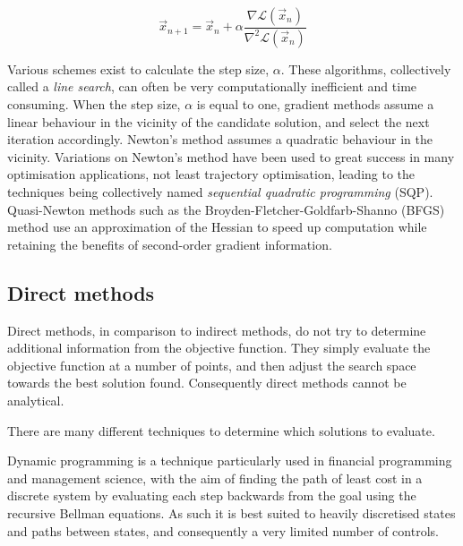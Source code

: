 \begin{equation} \label{eq:newtons-method}
\vec{x}_{n+1}=\vec{x}_n + \alpha\frac{\nabla\mathcal{L}(\vec{x}_n)}{\nabla^2\mathcal{L}(\vec{x}_n)}
\end{equation}

Various schemes exist to calculate the step size, $\alpha$. These algorithms, collectively called a \emph{line search}, can often be very computationally inefficient and time consuming. When the step size, $\alpha$ is equal to one, gradient methods assume a linear behaviour in the vicinity of the candidate solution, and select the next iteration accordingly. Newton's method assumes a quadratic behaviour in the vicinity. Variations on Newton's method have been used to great success in many optimisation applications, not least trajectory optimisation, leading to the techniques being collectively named \emph{sequential quadratic programming} (SQP). Quasi-Newton methods such as the Broyden-Fletcher-Goldfarb-Shanno (BFGS) method use an approximation of the Hessian to speed up computation while retaining the benefits of second-order gradient information. 



\subsection{Direct methods}

Direct methods, in comparison to indirect methods, do not try to determine additional information from the objective function. They simply evaluate the objective function at a number of points, and then adjust the search space towards the best solution found. Consequently direct methods cannot be analytical. %

There are many different techniques to determine which solutions to evaluate.

Dynamic programming is a technique particularly used in financial programming and management science, with the aim of finding the path of least cost in a discrete system by evaluating each step backwards from the goal using the recursive Bellman equations. As such it is best suited to heavily discretised states and paths between states, and consequently a very limited number of controls.

